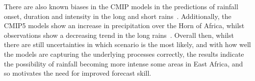 \documentclass[../main.tex]{subfiles}
\begin{document}

There are also known biases in the CMIP models in the predictions of rainfall onset, duration and intensity in the long and short rains~\citep{schwarzwald_understanding_2023, ayugi_comparison_2021}. Additionally, the CMIP5 models show an increase in precipitation over the Horn of Africa, whilst observations show a decreasing trend in the long rains~\citep{rowell_reconciling_2015, yang_east_2014}. Overall then, whilst there are still uncertainties in which scenario is the most likely, and with how well the models are capturing the underlying processes correctly, the results indicate the possibility of rainfall becoming more intense some areas in East Africa, and so motivates the need for improved forecast skill. 


\end{document}
